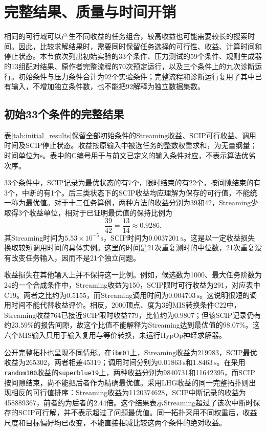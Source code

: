 \section{完整结果、质量与时间开销}
\label{sec:03_07}

相同的可行域可以产生不同收益的任务组合，较高收益也可能需要较长的搜索时间。因此，比较求解结果时，需要同时保留任务选择的可行性、收益、计算时间和停止状态。本节依次列出初始实验的33个条件、压力测试的59个条件、规则生成器的13组配对结果、原作者完整流程的70次预定运行，以及三个条件上的九次诊断运行。初始条件与压力条件合计为92个实验条件；完整流程和诊断运行复用了其中已有输入，不增加独立条件数，也不能把92解释为独立数据集数。

\subsection{初始33个条件的完整结果}

表\ref{tab:initial_results}保留全部初始条件的Streaming收益、SCIP可行收益、调用时间及SCIP停止状态。收益按原输入中被选任务的整数权重求和，为无量纲量；时间单位为$\mathrm{s}$。表中的C编号用于与前文已定义的输入条件对应，不表示算法优劣次序。



33个条件中，SCIP记录为最优状态的有7个，限时结束的有22个，按间隙结束的有3个，中断的有1个。后三类状态下的SCIP收益均应理解为保存的可行值，不能统一称为最优值。对于十二任务算例，两种方法的收益分别为39和42，Streaming少取得3个收益单位，相对于已证明最优值的保持比例为
\begin{equation}
 \frac{39}{42}=\frac{13}{14}\approx0.9286.
 \label{s0307:toy_quality}
\end{equation}
其Streaming时间为$5.53\times10^{-5}\,\mathrm{s}$，SCIP时间为$0.0037201\,\mathrm{s}$。这是以一定收益损失换取较短调用时间的具体实例。这里的时间是21次重复测时的中位数，21次重复没有改变任务输入，因而不是21个独立问题。

收益损失在其他输入上并不保持这一比例。例如，候选数为1000、最大任务阶数为24的一个合成条件中，Streaming收益为150，SCIP限时可行收益为291，对应表中C19。两者之比约为$0.5155$，而Streaming调用时间为$0.004703\,\mathrm{s}$。这说明很短的调用时间不能代替收益评价。相反，2000顶点、度为3的MIS转换条件C22中，Streaming收益764已接近SCIP限时收益779，比值约为$0.9807$；但该SCIP记录仍有约$23.59\%$的报告间隙，故这个比值不能解释为Streaming达到最优值的$98.07\%$。这六个MIS输入只用于输入复用与等价转换，未运行HypOp神经求解器。

公开完整拓扑也呈现不同情形。在\texttt{ibm01}上，Streaming收益为219983，SCIP最优收益为265302，两者相差45319；调用时间分别为$0.01863\,\mathrm{s}$和$1.8463\,\mathrm{s}$。在采用\texttt{random100}收益的\texttt{superblue19}上，两种收益分别为9840731和11642395，而SCIP按间隙结束，尚不能把后者作为精确最优值。采用LHG收益的同一完整拓扑则出现相反的可行值排序：Streaming收益为1120374628，SCIP中断记录的收益为458889367，前者约为后者的$2.44$倍。这个结果表示Streaming超过了该次中断时保存的SCIP可行解，并不表示超过了问题最优值。同一拓扑采用不同权重后，收益尺度和目标偏好均已改变，不能直接相减比较这两个条件的绝对收益。

